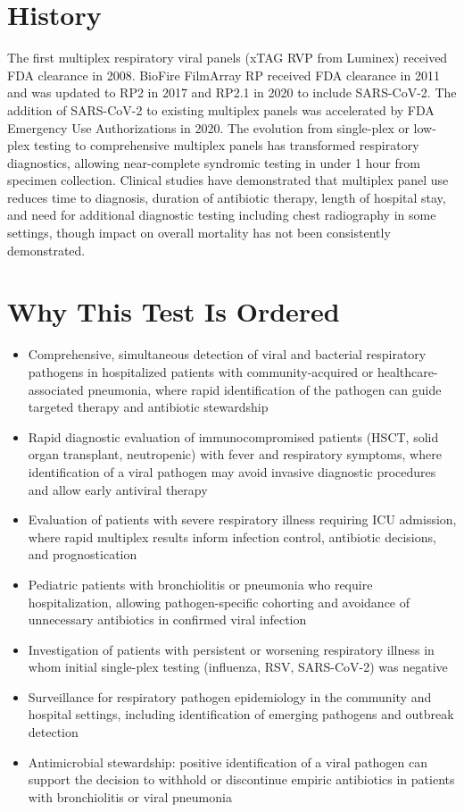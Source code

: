 \section*{History}
The first multiplex respiratory viral panels (xTAG RVP from Luminex) received FDA clearance in 2008. BioFire FilmArray RP received FDA clearance in 2011 and was updated to RP2 in 2017 and RP2.1 in 2020 to include SARS-CoV-2. The addition of SARS-CoV-2 to existing multiplex panels was accelerated by FDA Emergency Use Authorizations in 2020. The evolution from single-plex or low-plex testing to comprehensive multiplex panels has transformed respiratory diagnostics, allowing near-complete syndromic testing in under 1 hour from specimen collection. Clinical studies have demonstrated that multiplex panel use reduces time to diagnosis, duration of antibiotic therapy, length of hospital stay, and need for additional diagnostic testing including chest radiography in some settings, though impact on overall mortality has not been consistently demonstrated.

\section*{Why This Test Is Ordered}
\begin{itemize}
  \item Comprehensive, simultaneous detection of viral and bacterial respiratory pathogens in hospitalized patients with community-acquired or healthcare-associated pneumonia, where rapid identification of the pathogen can guide targeted therapy and antibiotic stewardship
  \item Rapid diagnostic evaluation of immunocompromised patients (HSCT, solid organ transplant, neutropenic) with fever and respiratory symptoms, where identification of a viral pathogen may avoid invasive diagnostic procedures and allow early antiviral therapy
  \item Evaluation of patients with severe respiratory illness requiring ICU admission, where rapid multiplex results inform infection control, antibiotic decisions, and prognostication
  \item Pediatric patients with bronchiolitis or pneumonia who require hospitalization, allowing pathogen-specific cohorting and avoidance of unnecessary antibiotics in confirmed viral infection
  \item Investigation of patients with persistent or worsening respiratory illness in whom initial single-plex testing (influenza, RSV, SARS-CoV-2) was negative
  \item Surveillance for respiratory pathogen epidemiology in the community and hospital settings, including identification of emerging pathogens and outbreak detection
  \item Antimicrobial stewardship: positive identification of a viral pathogen can support the decision to withhold or discontinue empiric antibiotics in patients with bronchiolitis or viral pneumonia
\end{itemize}

